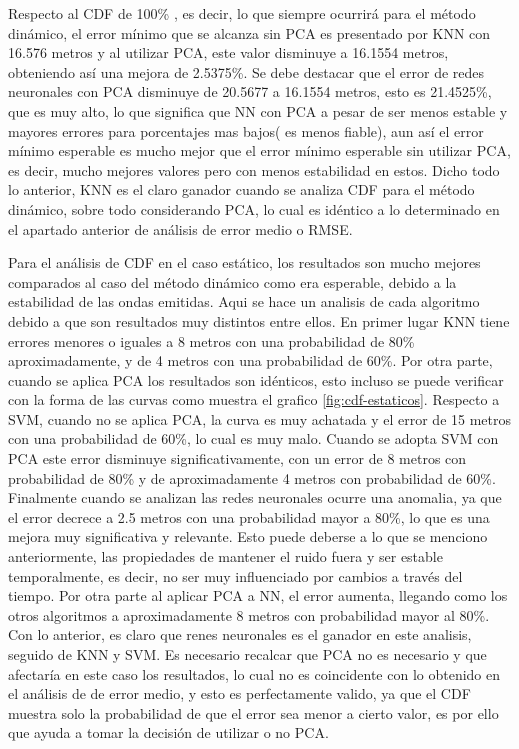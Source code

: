 Respecto al CDF de 100\% , es decir, lo que siempre ocurrirá para el método dinámico, el error mínimo que se alcanza sin PCA es presentado por KNN con 16.576 metros y al utilizar PCA, este valor disminuye a 16.1554 metros, obteniendo así una mejora de 2.5375\%.  Se debe destacar que el error de redes neuronales con PCA disminuye de 20.5677 a 16.1554  metros, esto es 21.4525\%, que es muy alto, lo que significa que NN con PCA a pesar de ser menos estable y mayores errores para porcentajes mas bajos( es menos fiable), aun así el error mínimo esperable es mucho mejor que el error mínimo esperable sin utilizar PCA, es decir, mucho mejores valores pero con menos estabilidad en estos. Dicho todo lo anterior, KNN es el claro ganador cuando se analiza CDF para el método dinámico, sobre todo considerando PCA, lo cual es idéntico a lo determinado en el apartado anterior de análisis de error medio o RMSE.

Para el análisis de CDF en el caso estático, los resultados son mucho mejores comparados al caso del método dinámico como era esperable, debido a la estabilidad de las ondas emitidas. Aqui se hace un analisis de cada algoritmo debido a que son resultados muy distintos entre ellos. En primer lugar KNN tiene errores menores o iguales a 8 metros con una probabilidad de 80\% aproximadamente, y de 4 metros con una probabilidad de 60\%. Por otra parte, cuando se aplica PCA los resultados son idénticos, esto incluso se puede verificar con la forma de las curvas como muestra el grafico \ref{fig:cdf-estaticos}. Respecto a SVM, cuando no se aplica PCA, la curva es muy achatada y el error de 15 metros con una probabilidad de 60\%, lo cual es muy malo. Cuando se adopta SVM con PCA este error disminuye significativamente, con un error de 8 metros con probabilidad de 80\% y de aproximadamente 4 metros con probabilidad de 60\%. Finalmente cuando se analizan las redes neuronales ocurre una anomalia, ya que el error decrece a 2.5 metros con una probabilidad mayor a 80\%, lo que es una mejora muy significativa y relevante. Esto puede deberse a lo que se menciono anteriormente, las propiedades de mantener el ruido fuera y ser estable temporalmente, es decir, no ser muy influenciado por cambios a través del tiempo. Por otra parte al aplicar PCA a NN, el error aumenta, llegando como los otros algoritmos a aproximadamente 8 metros con probabilidad mayor al 80\%. Con lo anterior, es claro que renes neuronales es el ganador en este analisis, seguido de KNN y SVM. Es necesario recalcar que PCA no es necesario y que afectaría en este caso los resultados, lo cual no es coincidente con lo obtenido en el análisis de de error medio, y esto es perfectamente valido, ya que el CDF muestra solo la probabilidad de que el error sea menor a cierto valor, es por ello que ayuda a tomar la decisión de utilizar o no PCA. 

